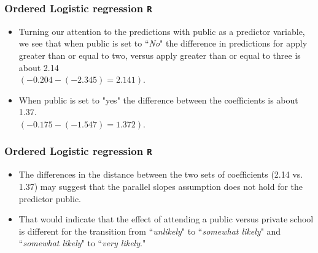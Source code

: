 \documentclass[00-GLMregslides.tex]{subfiles}
\begin{document}
\begin{frame}[fragile]
\frametitle{Ordered Logistic regression \texttt{R} }
\Large
\begin{itemize}
\item Turning our attention to the predictions with public as a predictor variable, we see that when public is set to ``\textit{No}" the difference in predictions for apply greater than or equal to two, versus apply greater than or equal to three is about 2.14 \\$(-0.204 - (-2.345) = 2.141)$. 
\item When public is set to "yes" the difference between the coefficients is about 1.37.\\ $(-0.175 - (-1.547) = 1.372)$.
\end{itemize}
\end{frame}
\begin{frame}[fragile]
\frametitle{Ordered Logistic regression \texttt{R} }
\Large
\begin{itemize}
\item  The differences in the distance between the two sets of coefficients (2.14 vs. 1.37) may suggest that the parallel slopes assumption does not hold for the predictor public. \smallskip
\item That would indicate that the effect of attending a public versus private school is different for the transition from ``\textit{unlikely}" to ``\textit{somewhat likely}" and ``\textit{somewhat likely}" to ``\textit{very likely}."
\end{itemize}
\end{frame}
	
\end{document}
